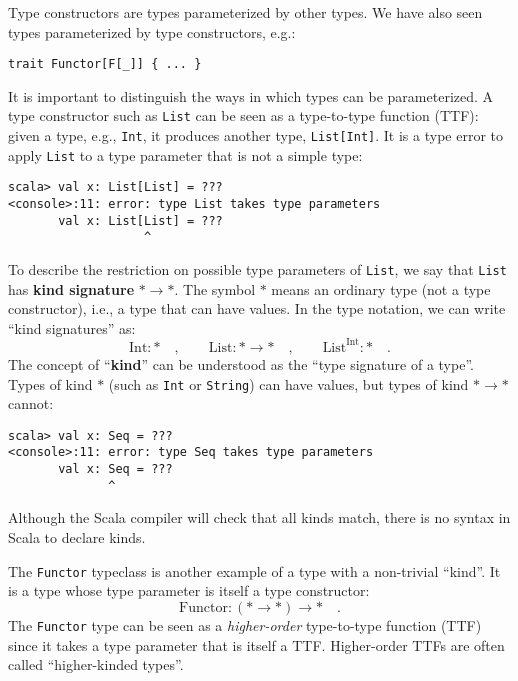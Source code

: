 Type constructors are types parameterized by other types. We have
also seen types parameterized by type constructors, e.g.:
\begin{lstlisting}
trait Functor[F[_]] { ... }
\end{lstlisting}
It is important to distinguish the ways in which types can be parameterized.
A type constructor such as \lstinline!List! can be seen as a type-to-type
function (TTF): given a type, e.g., \lstinline!Int!, it produces
another type, \lstinline!List[Int]!. It is a type error to apply
\lstinline!List! to a type parameter that is not a simple type:
\begin{lstlisting}
scala> val x: List[List] = ???
<console>:11: error: type List takes type parameters
       val x: List[List] = ???
                   ^
\end{lstlisting}
To describe the restriction on possible type parameters of \lstinline!List!,
we say that \lstinline!List! has \textbf{kind signature}
$*\rightarrow*$. The symbol $*$ means an ordinary type (not a type
constructor), i.e., a type that can have values. In the type notation,
we can write \textsf{``}kind signatures\textsf{''} as:
\[
\text{Int}:*\quad,\quad\quad\text{List}:*\rightarrow*\quad,\quad\quad\text{List}^{\text{Int}}:*\quad.
\]
The concept of \textsf{``}\textbf{kind}\textsf{''} can be understood as the \textsf{``}type
signature of a type\textsf{''}. Types of kind $*$ (such as \lstinline!Int!
or \lstinline!String!) can have values, but types of kind $*\rightarrow*$
cannot:
\begin{lstlisting}
scala> val x: Seq = ???
<console>:11: error: type Seq takes type parameters
       val x: Seq = ???
              ^
\end{lstlisting}
Although the Scala compiler will check that all kinds match, there
is no syntax in Scala to declare kinds.

The \lstinline!Functor! typeclass is another example of a type with
a non-trivial \textsf{``}kind\textsf{''}. It is a type whose type parameter is itself
a type constructor:
\[
\text{Functor}:(*\rightarrow*)\rightarrow*\quad.
\]
The \lstinline!Functor! type can be seen as a \emph{higher-order}
type-to-type function (TTF) since it takes a type parameter that is
itself a TTF. Higher-order TTFs
are often called \textsf{``}higher-kinded types\textsf{''}.

